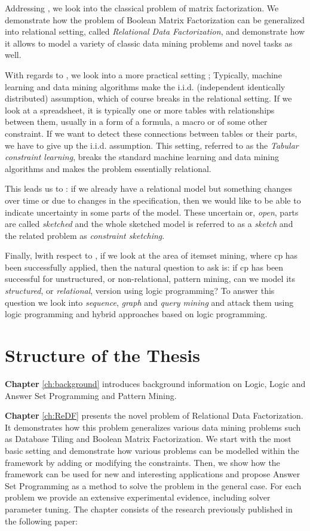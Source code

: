 Addressing \cone, we look into the classical problem of matrix
factorization. We demonstrate how the problem of Boolean Matrix
Factorization can be generalized into relational setting, called
\textit{Relational Data Factorization}, and
demonstrate how it allows to model a variety of classic data mining
problems and novel tasks as well.

With regards to \ctwo, we look into a more practical setting ;
Typically, machine learning and data mining algorithms make the i.i.d.
(independent identically distributed) assumption, which of course
breaks in the relational setting. If we look at a spreadsheet, it is
typically one or more tables with relationships between them, usually
in a form of a formula, a macro or of some other constraint. If we
want to detect these connections between tables or their parts, we
have to give up the i.i.d. assumption. This setting, referred to as the
\textit{Tabular constraint learning}, breaks the standard
machine learning and data mining algorithms and 
makes the problem essentially relational.

This leads us to \cthree: if we already have a relational model but
something changes over time or due to changes in the specification, then we would like
to be able to indicate uncertainty in some parts of the model. These
uncertain or, \textit{open}, parts are called \textit{sketched} and
the whole sketched model is referred to as a \textit{sketch} and the related
problem as \textit{constraint sketching}.

Finally, lwith respect to \cfour, if we look at the area of itemset mining, where \acrlong{cp}
has been successfully applied, then the natural question to ask is:
if \acrshort{cp} has been successful for unstructured, or
non-relational, pattern mining, can we model its \textit{structured},
or \textit{relational}, version using logic programming? To answer
this question we look into \textit{sequence}, \textit{graph} and
\textit{query mining} and attack them using logic programming and
hybrid approaches based on logic programming.


\section{Structure of the Thesis}
\textbf{Chapter} \ref{ch:background} introduces background information on Logic, Logic and Answer Set Programming and Pattern Mining.

\textbf{Chapter} \ref{ch:ReDF} presents the novel problem of Relational Data
Factorization. It demonstrates how this problem generalizes various
data mining problems such as Database Tiling and Boolean Matrix
Factorization. We start with the most basic setting and demonstrate
how various problems can be modelled within the framework by adding
or modifying the constraints. Then, we show how the framework can be
used for new and interesting applications and propose Answer Set
Programming as a method to solve the problem in the general case.
For each problem we provide an extensive experimental evidence,
including solver parameter tuning. The chapter consists of the
research previously published in the following paper:

